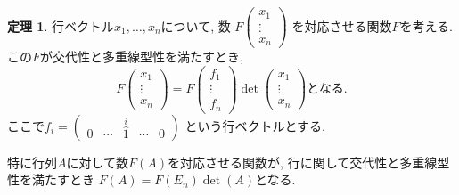 \documentclass[dvipdfmx,a4paper,11pt]{article}
\theoremstyle{definition}
\newtheorem{thm}{定理}
\begin{document}
\begin{tcolorbox}[
    colback = white,
    colframe = green!35!black,
    fonttitle = \bfseries,
    breakable = true]
    \begin{thm}
行ベクトル$x_1, \ldots, x_n$について, 数
$F\begin{pmatrix}
x_1 \\ \vdots \\ x_{n}
\end{pmatrix}$
を対応させる関数$F$を考える.
この$F$が交代性と多重線型性を満たすとき, 
$$
F\begin{pmatrix}
x_1 \\ \vdots \\ x_{n}
\end{pmatrix}
=
F\begin{pmatrix}
f_1 \\ \vdots \\ f_{n}
\end{pmatrix}
\det
\begin{pmatrix}
x_1 \\ \vdots \\ x_{n}
\end{pmatrix}
\text{となる.}
$$
ここで$f_i =
\begin{pmatrix}
0 & \cdots&\overset{i}{\hat{1}}&\cdots &0
\end{pmatrix}
$
という行ベクトルとする.

特に行列$A$に対して数$F(A)$を対応させる関数が, 行に関して交代性と多重線型性を満たすとき
$F(A) =F(E_n) \det(A)$となる.
  \end{thm}
 \end{tcolorbox}
 
\end{document}
